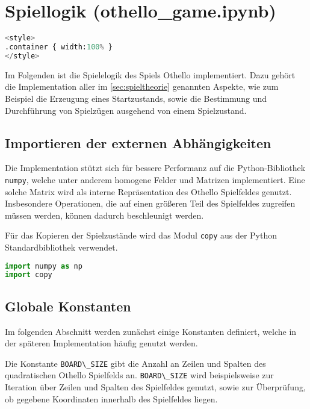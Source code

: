 \hypertarget{spiellogik-othello_game.ipynb}{%
\section{Spiellogik
(othello\_game.ipynb)}\label{spiellogik-othello_game.ipynb}}

\label{sec:gamelogic}

\begin{lstlisting}[language=Python]
%%HTML
<style>
.container { width:100% }
</style>
\end{lstlisting}

Im Folgenden ist die Spielelogik des Spiels Othello implementiert. Dazu
gehört die Implementation aller im \autoref{sec:spieltheorie} genannten
Aspekte, wie zum Beispiel die Erzeugung eines Startzustands, sowie die
Bestimmung und Durchführung von Spielzügen ausgehend von einem
Spielzustand.

\hypertarget{importieren-der-externen-abhuxe4ngigkeiten}{%
\subsection{Importieren der externen
Abhängigkeiten}\label{importieren-der-externen-abhuxe4ngigkeiten}}

Die Implementation stützt sich für bessere Performanz auf die
Python-Bibliothek \passthrough{\lstinline!numpy!}, welche unter anderem
homogene Felder und Matrizen implementiert. Eine solche Matrix wird als
interne Repräsentation des Othello Spielfeldes genutzt. Insbesondere
Operationen, die auf einen größeren Teil des Spielfeldes zugreifen
müssen werden, können dadurch beschleunigt werden.

Für das Kopieren der Spielzustände wird das Modul
\passthrough{\lstinline!copy!} aus der Python Standardbibliothek
verwendet.

\begin{lstlisting}[language=Python]
import numpy as np
import copy
\end{lstlisting}

\hypertarget{globale-konstanten}{%
\subsection{Globale Konstanten}\label{globale-konstanten}}

Im folgenden Abschnitt werden zunächst einige Konstanten definiert,
welche in der späteren Implementation häufig genutzt werden.

Die Konstante \passthrough{\lstinline!BOARD\_SIZE!} gibt die Anzahl an
Zeilen und Spalten des quadratischen Othello Spielfelds an.
\passthrough{\lstinline!BOARD\_SIZE!} wird beispielsweise zur Iteration
über Zeilen und Spalten des Spielfeldes genutzt, sowie zur Überprüfung,
ob gegebene Koordinaten innerhalb des Spielfeldes liegen.

